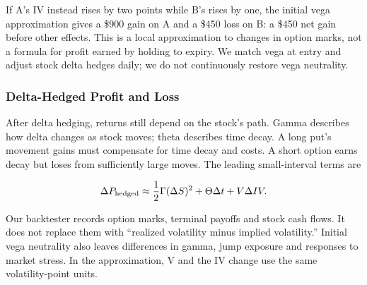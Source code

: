 If A's IV instead rises by two points while B's rises by one, the initial vega approximation gives a \$900 gain on A and a \$450 loss on B: a \$450 net gain before other effects. This is a local approximation to changes in option marks, not a formula for profit earned by holding to expiry. We match vega at entry and adjust stock delta hedges daily; we do not continuously restore vega neutrality.


\subsubsection*{Delta-Hedged Profit and Loss}

After delta hedging, returns still depend on the stock's path. Gamma describes how delta changes as stock moves; theta describes time decay. A long put's movement gains must compensate for time decay and costs. A short option earns decay but loses from sufficiently large moves. The leading small-interval terms are


\begin{equation*}\Delta P_{\rm hedged}\approx\frac{1}{2}\Gamma(\Delta S)^2+\Theta\Delta t+V\Delta IV.\end{equation*}

Our backtester records option marks, terminal payoffs and stock cash flows. It does not replace them with ``realized volatility minus implied volatility.'' Initial vega neutrality also leaves differences in gamma, jump exposure and responses to market stress. In the approximation, V and the IV change use the same volatility-point units.
\FloatBarrier
